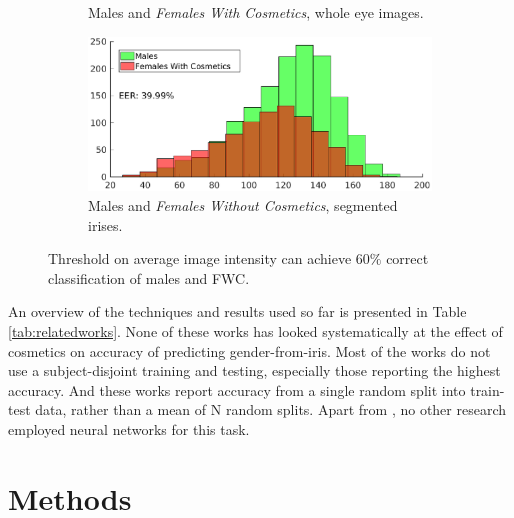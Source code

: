 \documentclass[10pt,twocolumn,letterpaper]{article}
\begin{document}
\begin{figure}[!htbp]
\begin{subfigure}[b]{0.45\textwidth}
        \caption{Males and \textit{Females With Cosmetics}, whole eye images.}
        \label{fig:disteyefwc}
    \end{subfigure}
    \hfill
    \begin{subfigure}[b]{0.45\textwidth}
        \centering
        \includegraphics[width=\textwidth]{img/males_vs_cosmetics_segmented_short.eps}
        \caption{Males and \textit{Females Without Cosmetics}, segmented irises.}
        \label{fig:distirisfwc}
    \end{subfigure}
    \caption{Threshold on average image intensity can achieve $60\%$ correct classification of males and FWC.}
    \label{fig:eer}
\end{figure}


An overview of the techniques and results used so far is presented in Table  \ref{tab:relatedworks}.
None of these works has looked systematically at the effect of cosmetics %
on accuracy of predicting gender-from-iris.
Most of the works do not use a subject-disjoint training and testing, especially those reporting the highest accuracy.
And these works report accuracy from a single random split into train-test data, rather than a mean of N random splits.
Apart from \cite{Fairhurst2015}, no other research employed neural networks for this task.



\section{Methods}
\label{methods}
\end{document}
